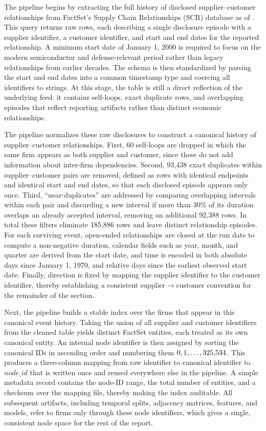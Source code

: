 The pipeline begins by extracting the full history of disclosed supplier--customer relationships from FactSet's Supply Chain Relationships (SCR) database as of \SCRExtractionDate \parencite{factset_supply_2024}. This query returns \NumRawRows raw rows, each describing a single disclosure episode with a supplier identifier, a customer identifier, and start and end dates for the reported relationship. A minimum start date of January 1, 2000 is required to focus on the modern semiconductor and defense-relevant period rather than legacy relationships from earlier decades. The schema is then standardized by parsing the start and end dates into a common timestamp type and coercing all identifiers to strings. At this stage, the table is still a direct reflection of the underlying feed: it contains self-loops, exact duplicate rows, and overlapping episodes that reflect reporting artifacts rather than distinct economic relationships.

The pipeline normalizes these raw disclosures to construct a canonical history of supplier--customer relationships. First, 60 self-loops are dropped in which the same firm appears as both supplier and customer, since these do not add information about inter-firm dependencies. Second, 93{,}438 exact duplicates within supplier--customer pairs are removed, defined as rows with identical endpoints and identical start and end dates, so that each disclosed episode appears only once. Third, ``near-duplicates'' are addressed by comparing overlapping intervals within each pair and discarding a new interval if more than 30\% of its duration overlaps an already accepted interval, removing an additional 92{,}388 rows. In total these filters eliminate 185{,}886 rows and leave \NumEpisodes distinct relationship episodes. For each surviving event, open-ended relationships are closed at the run date to compute a non-negative duration, calendar fields such as year, month, and quarter are derived from the start date, and time is encoded in both absolute days since January 1, 1970, and relative days since the earliest observed start date. Finally, direction is fixed by mapping the supplier identifier to the customer identifier, thereby establishing a consistent supplier$\rightarrow$customer convention for the remainder of the section.

Next, the pipeline builds a stable index over the firms that appear in this canonical event history. Taking the union of all supplier and customer identifiers from the cleaned table yields \NumFirms distinct FactSet entities, each treated as its own canonical entity. An internal node identifier is then assigned by sorting the canonical IDs in ascending order and numbering them \(0,1,\dots,325{,}534\). This produces a three-column mapping from raw identifier to canonical identifier to \(\mathit{node\_id}\) that is written once and reused everywhere else in the pipeline. A simple metadata record contains the node-ID range, the total number of entities, and a checksum over the mapping file, thereby making the index auditable. All subsequent artifacts, including temporal splits, adjacency matrices, features, and models, refer to firms only through these node identifiers, which gives a single, consistent node space for the rest of the report.

